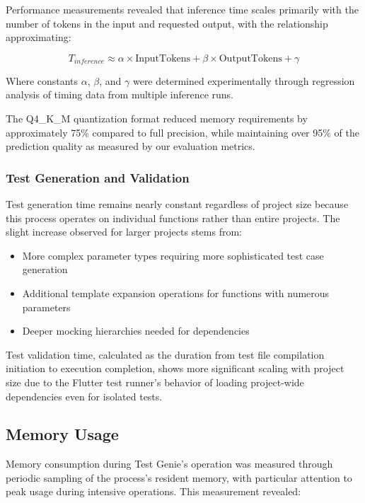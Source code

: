 Performance measurements revealed that inference time scales primarily with the number of tokens in the input and requested output, with the relationship approximating:

\[ T_{inference} \approx \alpha \times \text{InputTokens} + \beta \times \text{OutputTokens} + \gamma \]

Where constants $\alpha$, $\beta$, and $\gamma$ were determined experimentally through regression analysis of timing data from multiple inference runs.

The Q4\_K\_M quantization format reduced memory requirements by approximately 75\% compared to full precision, while maintaining over 95\% of the prediction quality as measured by our evaluation metrics.

\subsubsection{Test Generation and Validation}

Test generation time remains nearly constant regardless of project size because this process operates on individual functions rather than entire projects. The slight increase observed for larger projects stems from:

\begin{itemize}
    \item More complex parameter types requiring more sophisticated test case generation
    \item Additional template expansion operations for functions with numerous parameters
    \item Deeper mocking hierarchies needed for dependencies
\end{itemize}

Test validation time, calculated as the duration from test file compilation initiation to execution completion, shows more significant scaling with project size due to the Flutter test runner's behavior of loading project-wide dependencies even for isolated tests.

\subsection{Memory Usage}

Memory consumption during Test Genie's operation was measured through periodic sampling of the process's resident memory, with particular attention to peak usage during intensive operations. This measurement revealed:

